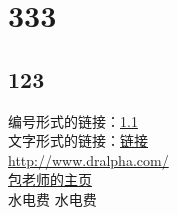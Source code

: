 \documentclass[12pt]{article}
\begin{document}
    \section{333}
    \subsection{123}
    \label{sec:hyperlink}
    编号形式的链接：\ref{sec:hyperlink}\\
    文字形式的链接：\hyperref[sec:hyperlink]{链接}\\
    \url{http://www.dralpha.com/}\\
    \href{http://www.dralpha.com/}{包老师的主页}\\
    水电费
    \printindex
    水电费
    \printindex
\end{document}
